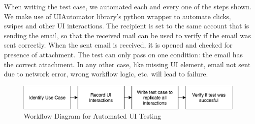 When writing the test case, we automated each and every one of the steps shown. We make use of UIAutomator library's python wrapper\cite{uiautomatordoc} to automate clicks, swipes and other UI interactions. The recipient is set to the same account that is sending the email, so that the received mail can be used to verify if the email was sent correctly. When the sent email is received, it is opened and checked for presence of attachment. The test can only pass on one condition: the email has the correct attachment. In any other case, like missing UI element, email not sent due to network error, wrong workflow logic, etc. will lead to failure.

\vspace{0.5cm}
\begin{figure}[!h]
 	\begin{center}
		\includegraphics[scale=0.7]{Workflow2}
		\caption{Workflow Diagram for Automated UI Testing}
	\end{center}
\end{figure}